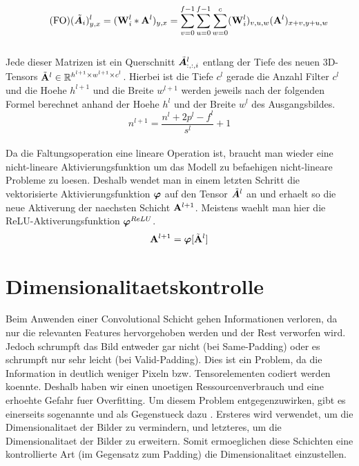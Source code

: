 \begin{equation}\tag{FO}
  (\tilde{\bm{A}}_i)_{y,x}^l = (\mathbf{W}_i^l * \mathbf{A}^l)_{y,x} = \sum_{v=0}^{f-1} \sum_{u=0}^{f-1} \sum_{w=0}^c (\mathbf{W}^l_i)_{v,u,w} (\mathbf{A}^l)_{x+v,y+u,w}
\end{equation}
\\
Jede dieser Matrizen ist ein Querschnitt $\tilde{\bm{A}}^l_{:,:,i}$ entlang der
Tiefe des neuen 3D-Tensors $\tilde{\mathbf{A}}^l \in \mathbb{R}^{h^{l+1} \times w^{l+1} \times c^l}$.
Hierbei ist die Tiefe $c^l$ gerade die Anzahl Filter $c^l$ und die Hoehe
$h^{l+1}$ und die Breite $w^{l+1}$ werden jeweils nach der folgenden Formel
berechnet anhand der Hoehe $h^l$ und der Breite $w^l$ des Ausgangsbildes.
\\
\begin{equation}
  n^{l+1} = \frac{n^l + 2p^l - f^l}{s^l} + 1
\end{equation}
\\
Da die Faltungsoperation eine lineare Operation ist, braucht man wieder eine
nicht-lineare Aktivierungsfunktion um das Modell zu befaehigen nicht-lineare Probleme zu
loesen.
Deshalb wendet man in einem letzten Schritt die vektorisierte Aktivierungsfunktion
$\bm{\varphi}$ auf den Tensor $\tilde{\bm{A}}^l$ an und erhaelt so die
neue Aktiverung der naechsten Schicht $\mathbf{A}^{l+1}$. Meistens waehlt man hier
die ReLU-Aktiverungsfunktion $\bm{\varphi}^{ReLU}$.
\begin{equation}
  \mathbf{A}^{l+1} = \bm{\varphi}[\tilde{\mathbf{A}}^l]
\end{equation}


\cite{wiki:cnn}
\cite{deeplearning.ai:cnn}
\cite{Goodfellow-et-al-2016}

\section{Dimensionalitaetskontrolle}
Beim Anwenden einer Convolutional Schicht gehen Informationen verloren, da nur
die relevanten Features hervorgehoben werden und der Rest verworfen wird. Jedoch
schrumpft das Bild entweder gar nicht (bei Same-Padding) oder es schrumpft nur
sehr leicht (bei Valid-Padding). Dies ist ein Problem, da die Information in
deutlich weniger Pixeln bzw. Tensorelementen codiert werden koennte. Deshalb
haben wir einen unoetigen Ressourcenverbrauch und eine erhoehte Gefahr fuer
Overfitting. Um diesem Problem entgegenzuwirken, gibt es einerseits sogenannte
 und als Gegenstueck dazu
. Ersteres wird verwendet, um die Dimensionalitaet
der Bilder zu vermindern, und letzteres, um die Dimensionalitaet der Bilder zu
erweitern. Somit ermoeglichen diese Schichten eine kontrollierte Art (im Gegensatz zum
Padding) die Dimensionalitaet einzustellen.


